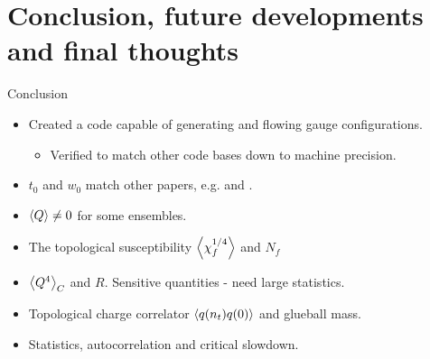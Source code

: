 \documentclass[10pt,show notes on second screen]{beamer}
\begin{document}
\section{Conclusion, future developments and final thoughts}
\begin{frame}{Conclusion}
\begin{itemize}
    \item <1->Created a code capable of generating and flowing gauge configurations.
    \begin{itemize}
        \item <2->Verified to match other code bases down to machine precision.
    \end{itemize}
    \item <3->$t_0$ and $w_0$ match other papers, e.g. \citet{luscher_properties_2010} and \citet{ce_non-gaussianities_2015}.%
    \item <4->$\left\langle{Q}\right\rangle \neq 0$ for some ensembles. %
    \item <5->The topological susceptibility $\left\langle{\chi^{1/4}_f}\right\rangle$ and $N_f$ %
    \item <6->$\left\langle{Q^4}\right\rangle_C$ and $R$. Sensitive quantities - need large statistics.%
    \item <7->Topological charge correlator $\left\langle{q(n_t)q(0)}\right\rangle$ and glueball mass. %
    \item <8->Statistics, autocorrelation and critical slowdown.%
\end{itemize}
\end{frame}
\end{document}
